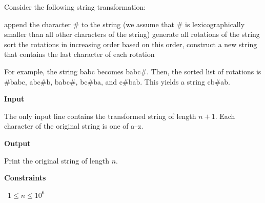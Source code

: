 Consider the following string transformation:

append the character \# to the string (we assume that \# is lexicographically smaller than all other characters of the string)
generate all rotations of the string
sort the rotations in increasing order
based on this order, construct a new string that contains the last character of each rotation

For example, the string babc becomes babc\#. Then, the sorted list of rotations is \#babc, abc\#b, babc\#, bc\#ba, and c\#bab. This yields a string cb\#ab.

\vspace{0.3cm}\noindent\textbf{Input}

The only input line contains the transformed string of length $n+1$. Each character of the original string is one of a–z.

\vspace{0.3cm}\noindent\textbf{Output}

Print the original string of length $n$.

\vspace{0.3cm}\noindent\textbf{Constraints}

\textbullet\ $1 \le n \le 10^6$